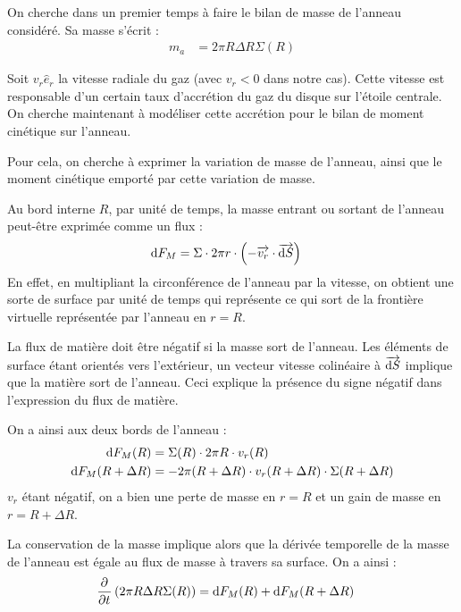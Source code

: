 On cherche dans un premier temps à faire le bilan de masse de l'anneau considéré. Sa masse s'écrit :
\begin{align}
m_a &= 2\pi R \Delta R \Sigma(R)\label{eq:m_a}
\end{align}

\bigskip

Soit $v_r\hat{e}_r$ la vitesse radiale du gaz (avec $v_r<0$ dans notre cas). Cette vitesse est responsable d'un certain taux d'accrétion du gaz du disque sur l'étoile centrale. On cherche maintenant à modéliser cette accrétion pour le bilan de moment cinétique sur l'anneau.

Pour cela, on cherche à exprimer la variation de masse de l'anneau, ainsi que le moment cinétique emporté par cette variation de masse. 

Au bord interne $R$, par unité de temps, la masse entrant ou sortant de l'anneau peut-être exprimée comme un flux :
\begin{align}
\operatorname{d \!} F_M &= \Sigma \cdot 2\pi r \cdot \left( -{\overrightarrow{v_r}} \cdot {\overrightarrow{\operatorname{d \!}S}} \right)
\end{align}
En effet, en multipliant la circonférence de l'anneau par la vitesse, on obtient une sorte de surface par unité de temps qui représente ce qui sort de la frontière virtuelle représentée par l'anneau en $r=R$. 

La flux de matière doit être négatif si la masse sort de l'anneau. Les éléments de surface étant orientés vers l'extérieur, un vecteur vitesse colinéaire à ${\overrightarrow{\operatorname{d \!} S}}$ implique que la matière sort de l'anneau. Ceci explique la présence du signe négatif dans l'expression du flux de matière.

On a ainsi aux deux bords de l'anneau :
\begin{subequations}
\begin{align}
\operatorname{d \!} F_M(R) &= \Sigma(R) \cdot 2\pi R \cdot v_r(R)\\
\operatorname{d \!} F_M(R+\Delta R) &= - 2\pi (R+\Delta R) \cdot v_r(R+\Delta R) \cdot \Sigma(R+\Delta R)
\end{align}\label{eq:dif_F_M}
\end{subequations}
$v_r$ étant négatif, on a bien une perte de masse en $r=R$ et un gain de masse en $r=R+\Delta R$.

La conservation de la masse implique alors que la dérivée temporelle de la masse de l'anneau est égale au flux de masse à travers sa surface. On a ainsi : 
\begin{align*}
\mathinner{ \dfrac{\partial{^{}}}{\partial{{t}^{}}} }\left(2\pi R \Delta R \Sigma(R)\right) &= \operatorname{d \!} F_M(R) + \operatorname{d \!} F_M(R+\Delta R)
\end{align*}

